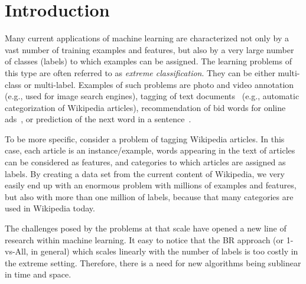 \documentclass{article}
\begin{document}
\section{Introduction}
\label{sec:introduction}


Many current applications of machine learning are characterized not only by a vast number of training examples and features, but also by a very large number of classes (labels) to which examples can be assigned. The learning problems of this type are often referred to as \emph{extreme classification}. They can be either multi-class or multi-label. Examples of such problems are photo and video annotation~\citep{Deng_et_al_2011} (e.g., used for image search engines), tagging of text documents~\citep{Dekel_Shamir_2010} (e.g., automatic categorization of Wikipedia articles), recommendation of bid words for online ads~\citep{Prabhu_Varma_2014}, or prediction of the next word in a sentence~\citep{Mikolov_et_al_2013}.

To be more specific, consider a problem of tagging Wikipedia articles. In this case, each article is an instance/example, words appearing in the text of articles can be considered as features, and categories to which articles are assigned as labels. By creating a data set from the current content of Wikipedia, we very easily end up with an enormous problem with millions of examples and features, but also with more than one million of labels, because that many categories are used in Wikipedia today. 

The challenges posed by the problems at that scale have opened a new line of research within machine learning. It easy to notice that the BR approach (or 1-vs-All, in general) which scales linearly with the number of labels is too costly in the extreme setting. Therefore, there is a need for new algorithms being sublinear in time and space. 
\end{document}
